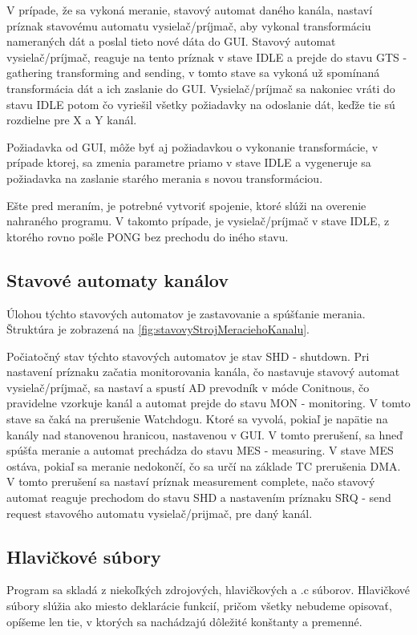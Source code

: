 \documentclass[main.tex]{subfiles}
\begin{document}
\begin{multicols*}{2}
			V prípade, že sa vykoná meranie, stavový automat daného kanála, nastaví príznak stavovému automatu vysielač/príjmač, aby vykonal transformáciu nameraných dát a poslal tieto nové dáta do GUI. Stavový automat vysielač/príjmač, reaguje na tento príznak v stave IDLE a prejde do stavu GTS - gathering transforming and sending, v tomto stave sa vykoná už spomínaná transformácia dát a ich zaslanie do GUI. Vysielač/príjmač sa nakoniec vráti do stavu IDLE potom čo vyriešil všetky požiadavky na odoslanie dát, keďže tie sú rozdielne pre X a Y kanál.
			
			Požiadavka od GUI, môže byť aj požiadavkou o vykonanie transformácie, v prípade ktorej, sa zmenia parametre priamo v stave IDLE a vygeneruje sa požiadavka na zaslanie starého merania s novou transformáciou.
			
			
			
			\vskip 0.25cm
			
			Ešte pred meraním, je potrebné vytvoriť spojenie, ktoré slúži na overenie nahraného programu. V takomto prípade, je vysielač/príjmač v stave IDLE, z ktorého rovno pošle PONG bez prechodu do iného stavu.
			
			\subsection{Stavové automaty kanálov}
			Úlohou týchto stavových automatov je zastavovanie a spúšťanie merania. Štruktúra je zobrazená na \cref{fig:stavovyStrojMeraciehoKanalu}.
			
			
			\vskip 0.25cm
			
			
			Počiatočný stav týchto stavových automatov je stav SHD - shutdown. Pri nastavení príznaku začatia monitorovania kanála, čo nastavuje stavový automat vysielač/príjmač, sa nastaví a spustí AD prevodník v móde Conitnous, čo pravidelne vzorkuje kanál a automat prejde do stavu MON - monitoring. V tomto stave sa čaká na prerušenie Watchdogu. Ktoré sa vyvolá, pokiaľ je napätie na kanály nad stanovenou hranicou, nastavenou v GUI. V tomto prerušení, sa hneď spúšťa meranie a automat prechádza do stavu MES - measuring. V stave MES ostáva, pokiaľ sa meranie nedokončí, čo sa určí na základe TC prerušenia DMA. V tomto prerušení sa nastaví príznak measurement complete, načo stavový automat reaguje prechodom do stavu SHD a nastavením príznaku SRQ - send request stavového automatu vysielač/prijmač, pre daný kanál. 
			
			\subsection{Hlavičkové súbory}
			Program sa skladá z niekoľkých zdrojových, hlavičkových a  .c súborov. Hlavičkové súbory slúžia ako miesto deklarácie funkcií, pričom všetky nebudeme opisovať, opíšeme len tie, v ktorých sa nachádzajú dôležité konštanty a premenné.
			

\end{multicols*}
\end{document}
